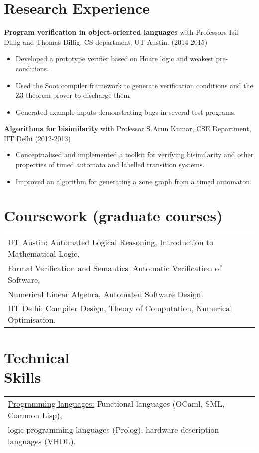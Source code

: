 \documentclass[margin]{res}
\begin{document}
\begin{resume}
\section{Research Experience}
 
 {\bf Program verification in object-oriented languages} with
 Professors Isil Dillig and Thomas Dillig, CS department, UT
 Austin. \hfill (2014-2015)
 \begin{itemize} \itemsep -2pt  %
 \item Developed a prototype verifier based on Hoare logic and weakest
   pre-conditions.
 \item Used the Soot compiler framework to generate
   verification conditions and the Z3 theorem prover to discharge them.
 \item Generated example
   inputs demonstrating bugs in several test programs.
 \end{itemize}

        {\bf Algorithms for bisimilarity} with Professor S
        Arun Kumar, CSE Department, IIT Delhi    \hfill
        (2012-2013) 
        \begin{itemize} \itemsep -2pt
        \item Conceptualised and implemented a toolkit for
          verifying bisimilarity and other properties of timed automata
          and labelled transition systems.
        \item Improved an algorithm for generating a zone
          graph from a timed automaton.

	\end{itemize}

\section{Coursework (graduate courses)}
\begin{tabular}{l p{3in}}
  \underline{UT Austin:} Automated Logical Reasoning, Introduction to
  Mathematical Logic, \\ Formal Verification and Semantics, Automatic
  Verification of Software, \\ Numerical Linear Algebra, Automated
  Software Design. \\
  \underline{IIT Delhi:} Compiler Design,
  Theory of Computation, Numerical Optimisation.
\end{tabular}

\section{Technical \\ Skills}
   \begin{tabular}{l p{3in}}
    \underline{Programming languages:} Functional languages (OCaml,
    SML, Common Lisp), \\ logic programming languages (Prolog),
    hardware description languages (VHDL). \\


\end{tabular}
\end{resume}
\end{document}
